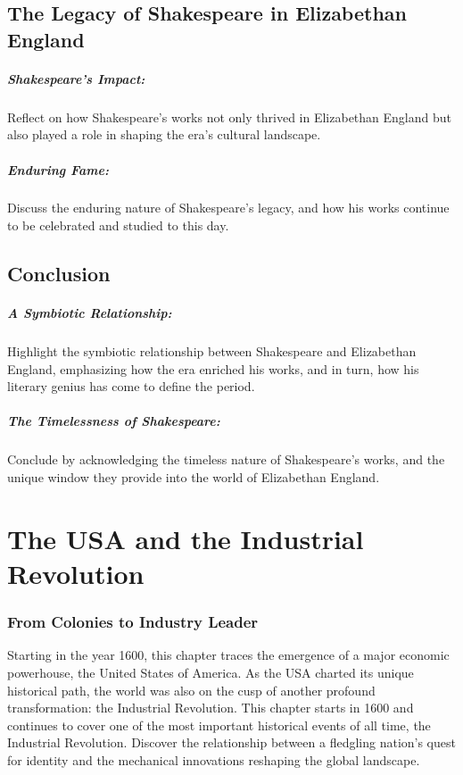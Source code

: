 \documentclass[a4paper,12pt]{book}
\begin{document}
\section*{The Legacy of Shakespeare in Elizabethan England}

\paragraph{Shakespeare’s Impact:}
Reflect on how Shakespeare’s works not only thrived in Elizabethan England but also played a role in shaping the era’s cultural landscape.

\paragraph{Enduring Fame:}
Discuss the enduring nature of Shakespeare’s legacy, and how his works continue to be celebrated and studied to this day.

\section*{Conclusion}

\paragraph{A Symbiotic Relationship:}
Highlight the symbiotic relationship between Shakespeare and Elizabethan England, emphasizing how the era enriched his works, and in turn, how his literary genius has come to define the period.

\paragraph{The Timelessness of Shakespeare:}
Conclude by acknowledging the timeless nature of Shakespeare’s works, and the unique window they provide into the world of Elizabethan England.

\chapter{The USA and the Industrial Revolution}
\subsection*{From Colonies to Industry Leader}
Starting in the year 1600, this chapter traces the emergence of a major economic powerhouse, the United States of America. As the USA charted its unique historical path, the world was also on the cusp of another profound transformation: the Industrial Revolution. This chapter starts in 1600 and continues to cover one of the most important historical events of all time, the Industrial Revolution. Discover the relationship between a fledgling nation's quest for identity and the mechanical innovations reshaping the global landscape.
\end{document}
